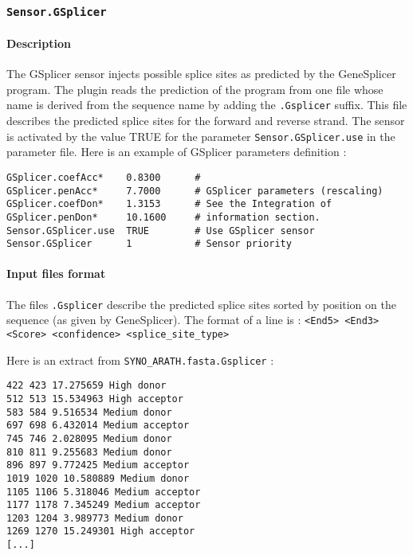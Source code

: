 
\subsubsection{\texttt{Sensor.GSplicer}}

\paragraph{Description}

The GSplicer sensor injects possible splice sites as predicted by the
GeneSplicer program. The plugin reads the prediction of the
program from one file whose name is derived from the sequence name by
adding the \texttt{.Gsplicer} suffix. This file describes the predicted
splice sites for the forward and reverse strand.  The sensor is
activated by the value TRUE for the parameter
\texttt{Sensor.GSplicer.use} in the parameter file.  Here is an
example of GSplicer parameters definition :
\begin{Verbatim}[fontsize=\small]
GSplicer.coefAcc*    0.8300      #
GSplicer.penAcc*     7.7000      # GSplicer parameters (rescaling)
GSplicer.coefDon*    1.3153      # See the Integration of
GSplicer.penDon*     10.1600     # information section.
Sensor.GSplicer.use  TRUE        # Use GSplicer sensor
Sensor.GSplicer      1           # Sensor priority
\end{Verbatim}

\paragraph{Input files format}

The files \texttt{.Gsplicer} describe the predicted splice sites
sorted by position on the sequence (as given by GeneSplicer).
The format of a line is : \texttt{<End5> <End3> <Score> <confidence>
  <splice\_site\_type>}

Here is an extract from \texttt{SYNO\_ARATH.fasta.Gsplicer} :
\begin{Verbatim}[fontsize=\small]
422 423 17.275659 High donor
512 513 15.534963 High acceptor
583 584 9.516534 Medium donor
697 698 6.432014 Medium acceptor
745 746 2.028095 Medium donor
810 811 9.255683 Medium donor
896 897 9.772425 Medium acceptor
1019 1020 10.580889 Medium donor
1105 1106 5.318046 Medium acceptor
1177 1178 7.345249 Medium acceptor
1203 1204 3.989773 Medium donor
1269 1270 15.249301 High acceptor
[...]
\end{Verbatim}

